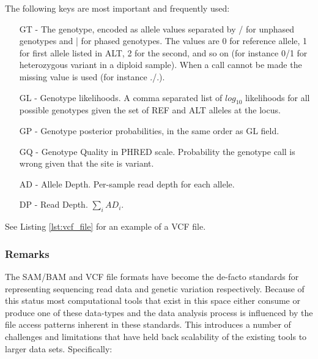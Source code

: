 The following keys are most important and frequently used:

\begin{itemize}
    \item [GT] - The genotype, encoded as allele values separated by / for unphased genotypes and | for phased genotypes. The values are 0 for reference allele, 1 for first allele listed in ALT, 2 for the second, and so on (for instance 0/1 for heterozygous variant in a diploid sample). When a call cannot be made the missing value is used (for instance ./.).
    \item [GL] - Genotype likelihoods. A comma separated list of $log_{10}$ likelihoods for all possible genotypes given the set of REF and ALT alleles at the locus.
    \item [GP] - Genotype posterior probabilities, in the same order as GL field.
    \item [GQ] - Genotype Quality in PHRED scale. Probability the genotype call is wrong given that the site is variant.
    \item [AD] - Allele Depth. Per-sample read depth for each allele.
    \item [DP] - Read Depth. $\sum_i AD_i$.
\end{itemize}

See Listing \ref{lst:vcf_file} for an example of a VCF file.

\subsubsection{Remarks}

The SAM/BAM and VCF file formats have become the de-facto standards for representing sequencing read data and genetic variation respectively. Because of this status most computational tools that exist in this space either consume or produce one of these data-types and the data analysis process is influenced by the file access patterns inherent in these standards. This introduces a number of challenges and limitations that have held back scalability of the existing tools to larger data sets. Specifically:

